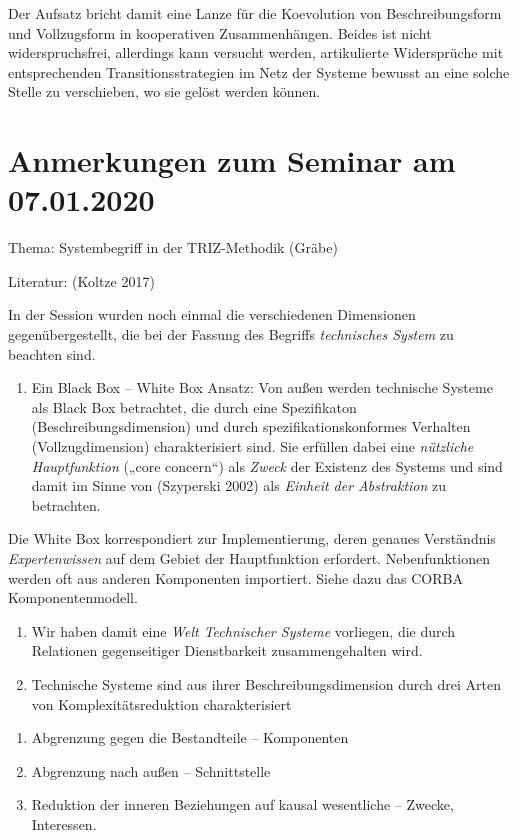 \documentclass[11pt,a4paper]{article}
\begin{document}
Der Aufsatz bricht damit eine Lanze für die Koevolution von Beschreibungsform
und Vollzugsform in kooperativen Zusammenhängen.  Beides ist nicht
widerspruchsfrei, allerdings kann versucht werden, artikulierte Widersprüche
mit entsprechenden Transitionsstrategien im Netz der Systeme bewusst an eine
solche Stelle zu verschieben, wo sie gelöst werden können.

\section{ Anmerkungen zum Seminar am 07.01.2020}

Thema: Systembegriff in der TRIZ-Methodik (Gräbe)

Literatur: (Koltze 2017)

In der Session wurden noch einmal die verschiedenen Dimensionen
gegenübergestellt, die bei der Fassung des Begriffs \emph{technisches System}
zu beachten sind.

\begin{enumerate}[noitemsep]
\item Ein Black Box -- White Box Ansatz: Von außen werden technische Systeme
  als Black Box betrachtet, die durch eine Spezifikaton
  (Beschreibungsdimension) und durch spezifikationskonformes Verhalten
  (Vollzugdimension) charakterisiert sind. Sie erfüllen dabei eine
  \emph{nützliche Hauptfunktion} („core concern“) als \emph{Zweck} der
  Existenz des Systems und sind damit im Sinne von (Szyperski 2002) als
  \emph{Einheit der Abstraktion} zu betrachten.
\end{enumerate}

Die White Box korrespondiert zur Implementierung, deren genaues Verständnis
\emph{Expertenwissen} auf dem Gebiet der Hauptfunktion erfordert.
Nebenfunktionen werden oft aus anderen Komponenten importiert. Siehe dazu das
CORBA Komponentenmodell.

\begin{enumerate}
\item Wir haben damit eine \emph{Welt Technischer Systeme} vorliegen, die
  durch Relationen gegenseitiger Dienstbarkeit zusammengehalten wird.
\item Technische Systeme sind aus ihrer Beschreibungsdimension durch drei
  Arten von Komplexitätsreduktion charakterisiert
\end{enumerate}

\begin{enumerate}[noitemsep]
\item Abgrenzung gegen die Bestandteile -- Komponenten
\item Abgrenzung nach außen -- Schnittstelle
\item Reduktion der inneren Beziehungen auf kausal wesentliche -- Zwecke,
  Interessen.
\end{enumerate}
\end{document}
